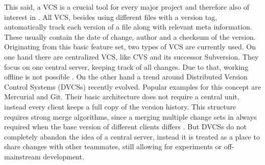 	This said, a VCS is a crucial tool for every major project and therefore also of interest in \sysbio \citep{Waltemath2013,Beard2009,Hucka2003,Li2010,Miller2011}.
	All VCS, besides using different files with a version tag, automatically track each version of a file along with relevant meta information. These usually contain the date of change, author and a checksum of the version.
	Originating from this basic feature set, two types of VCS are currently used. On one hand there are centralized VCS, like CVS and its successor Subversion. They focus on one central server, keeping track of all changes. Due to that, working offline is not possible \citep{Collins-Sussman2004}.
	On the other hand a trend around Distributed Version Control Systems (DVCSs) recently evolved. Popular examples for this concept are Mercurial and Git. Their basic architecture does not require a central unit, instead every client keeps a full copy of the version history.
	This structure requires strong merge algorithms, since a merging multiple change sets in always required when the base version of different clients differs \citep{OSullivan2009}.
	But DVCSs do not completely abandon the idea of a central server, instead it is treated as a place to share changes with other teammates, still allowing for experiments or off-mainstream development.
	

		
